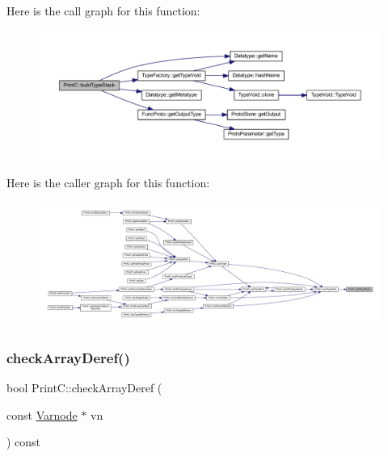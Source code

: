 Here is the call graph for this function\+:
\nopagebreak
\begin{figure}[H]
\begin{center}
\leavevmode
\includegraphics[width=350pt]{class_print_c_a18fa1574b22c87e7ef25e4a0b99284ac_cgraph}
\end{center}
\end{figure}
Here is the caller graph for this function\+:
\nopagebreak
\begin{figure}[H]
\begin{center}
\leavevmode
\includegraphics[width=350pt]{class_print_c_a18fa1574b22c87e7ef25e4a0b99284ac_icgraph}
\end{center}
\end{figure}
\mbox{\label{class_print_c_adb5d1d809d390a69943576628118b83b}} 
\subsubsection{\texorpdfstring{checkArrayDeref()}{checkArrayDeref()}}
{\footnotesize\ttfamily bool Print\+C\+::check\+Array\+Deref (\begin{DoxyParamCaption}\item[{const \mbox{\hyperlink{class_varnode}{Varnode}} $\ast$}]{vn }\end{DoxyParamCaption}) const\hspace{0.3cm}{\ttfamily [protected]}}




